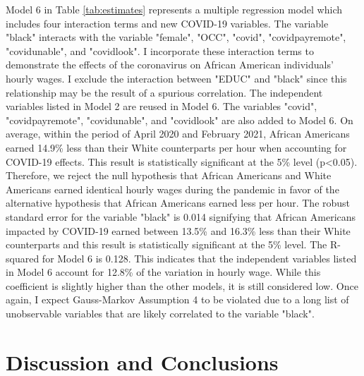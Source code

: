 \documentclass[12pt, english]{article}
\begin{document}
Model 6 in Table \ref{tab:estimates} represents a multiple regression model which includes four interaction terms and new COVID-19 variables. The variable "black" interacts with the variable "female", "OCC", "covid", "covidpayremote", "covidunable", and "covidlook". I incorporate these interaction terms to demonstrate the effects of the coronavirus on African American individuals' hourly wages. I exclude the interaction between "EDUC" and "black" since this relationship may be the result of a spurious correlation. The independent variables listed in Model 2 are reused in Model 6. The variables "covid", "covidpayremote", "covidunable", and "covidlook" are also added to Model 6. On average, within the period of April 2020 and February 2021, African Americans earned 14.9\% less than their White counterparts per hour when accounting for COVID-19 effects. This result is statistically significant at the 5\% level (p\textless0.05). Therefore, we reject the null hypothesis that African Americans and White Americans earned identical hourly wages during the pandemic in favor of the alternative hypothesis that African Americans earned less per hour. The robust standard error for the variable "black" is 0.014 signifying that African Americans impacted by COVID-19 earned between 13.5\% and 16.3\% less than their White counterparts and this result is statistically significant at the 5\% level. The R-squared for Model 6 is 0.128. This indicates that the independent variables listed in Model 6 account for 12.8\% of the variation in hourly wage. While this coefficient is slightly higher than the other models, it is still considered low. Once again, I expect Gauss-Markov Assumption 4 to be violated due to a long list of unobservable variables that are likely correlated to the variable "black".


\section{Discussion and Conclusions}
\end{document}
